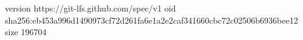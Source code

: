 version https://git-lfs.github.com/spec/v1
oid sha256:eb453a996d1490973cf72d261fa6e1a2e2caf341660cbc72c02506b6936bee12
size 196704
